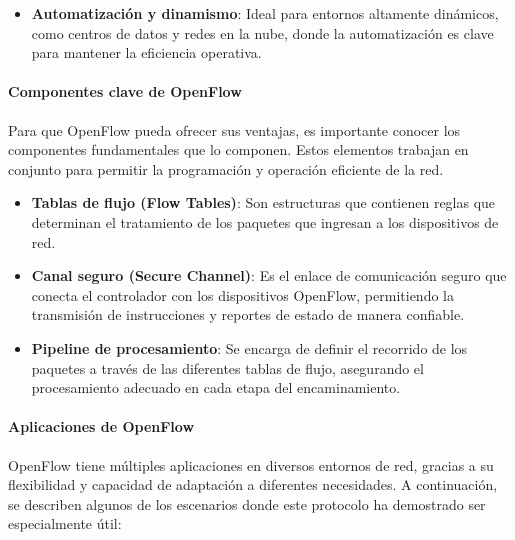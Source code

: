 {\begin{itemize}
                        \item \textbf{Automatización y dinamismo}: Ideal para entornos altamente dinámicos, como centros de datos y redes en la nube, donde la automatización es clave para mantener la eficiencia operativa.
                    \end{itemize}
                
                \paragraph{Componentes clave de OpenFlow}
                    Para que OpenFlow pueda ofrecer sus ventajas, es importante conocer los componentes fundamentales que lo componen. Estos elementos trabajan en conjunto para permitir la programación y operación eficiente de la red.
                    
                    \begin{itemize}
                        \item \textbf{Tablas de flujo (Flow Tables)}: Son estructuras que contienen reglas que determinan el tratamiento de los paquetes que ingresan a los dispositivos de red.
                        
                        \item \textbf{Canal seguro (Secure Channel)}: Es el enlace de comunicación seguro que conecta el controlador con los dispositivos OpenFlow, permitiendo la transmisión de instrucciones y reportes de estado de manera confiable.
                        
                        \item \textbf{Pipeline de procesamiento}: Se encarga de definir el recorrido de los paquetes a través de las diferentes tablas de flujo, asegurando el procesamiento adecuado en cada etapa del encaminamiento.
                    \end{itemize}
                
                \paragraph{Aplicaciones de OpenFlow}                
                    OpenFlow tiene múltiples aplicaciones en diversos entornos de red, gracias a su flexibilidad y capacidad de adaptación a diferentes necesidades. A continuación, se describen algunos de los escenarios donde este protocolo ha demostrado ser especialmente útil:
                    
}

